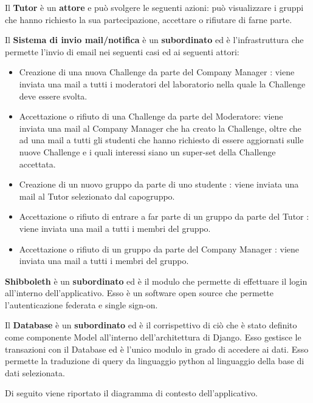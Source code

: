 Il \textbf{Tutor} è un \textbf{attore} e può svolgere le seguenti azioni: può visualizzare i gruppi che hanno richiesto la sua partecipazione, accettare o rifiutare di farne parte.

Il \textbf{Sistema di invio mail/notifica} è un \textbf{subordinato} ed è l'infrastruttura che permette l'invio di email nei seguenti casi ed ai seguenti attori:
\begin{itemize}
    \item Creazione di una nuova Challenge da parte del Company Manager : viene inviata una mail a tutti i moderatori del laboratorio nella quale la Challenge deve essere svolta. 
    \item Accettazione o rifiuto di una Challenge da parte del Moderatore: viene inviata una mail al Company Manager che ha creato la Challenge, oltre che ad una mail a tutti gli studenti che hanno richiesto di essere aggiornati sulle nuove Challenge e i quali interessi siano un super-set della Challenge accettata.
    \item Creazione di un nuovo gruppo da parte di uno studente : viene inviata una mail al Tutor selezionato dal capogruppo.
    \item Accettazione o rifiuto di entrare a far parte di un gruppo da parte del Tutor : viene inviata una mail a tutti i membri del gruppo.
    \item Accettazione o rifiuto di un gruppo da parte del Company Manager : viene inviata una mail a tutti i membri del gruppo.
\end{itemize}

\textbf{Shibboleth} è un \textbf{subordinato} ed è il modulo che permette di effettuare il login all'interno dell'applicativo. Esso è un software open source che permette l'autenticazione federata e single sign-on.

Il \textbf{Database} è un \textbf{subordinato} ed è il corrispettivo di ciò che è stato definito come componente Model all'interno dell'architettura di Django. Esso gestisce le transazioni con il Database ed è l'unico modulo in grado di accedere ai dati. Esso permette la traduzione di query da linguaggio python al linguaggio della base di dati selezionata. 

Di seguito viene riportato il diagramma di contesto dell'applicativo.


